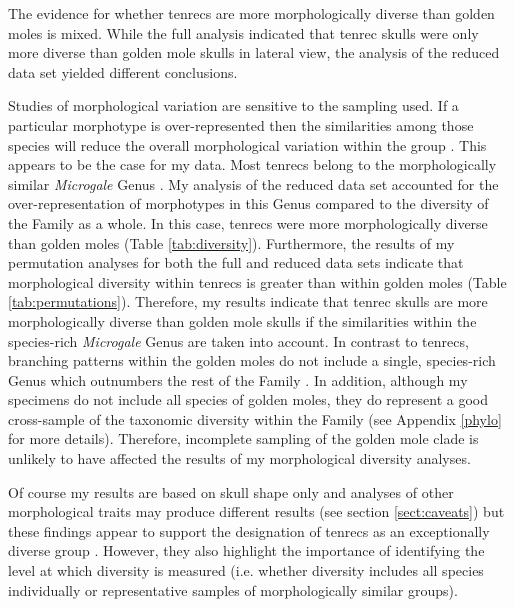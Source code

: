 	

	The evidence for whether tenrecs are more morphologically diverse than golden moles is mixed. While the full analysis indicated that tenrec skulls were only more diverse than golden mole skulls in lateral view, the analysis of the reduced data set yielded different conclusions.
	
	Studies of morphological variation are sensitive to the sampling used. If a particular morphotype is over-represented then the similarities among those species will reduce the overall morphological variation within the group \citep{Foote1991}. This appears to be the case for my data. Most tenrecs belong to the morphologically similar \textit{Microgale} Genus \citep{Jenkins2003}. My analysis of the reduced data set accounted for the over-representation of morphotypes in this Genus compared to the diversity of the Family as a whole. In this case, tenrecs were more morphologically diverse than golden moles (Table \ref{tab:diversity}). Furthermore, the results of my permutation analyses for both the full and reduced data sets indicate that morphological diversity within tenrecs is greater than within golden moles (Table \ref{tab:permutations}).
	Therefore, my results indicate that tenrec skulls are more morphologically diverse than golden mole skulls if the similarities within the species-rich \textit{Microgale} Genus are taken into account. 
	In contrast to tenrecs, branching patterns within the golden moles do not include a single, species-rich Genus which outnumbers the rest of the Family \citep{Asher2010}. In addition, although my specimens do not include all species of golden moles, they do represent a good cross-sample of the taxonomic diversity within the Family (see Appendix \ref{phylo} for more details). Therefore, incomplete sampling of the golden mole clade is unlikely to have affected the results of my morphological diversity analyses.
	
	Of course my results are based on skull shape only and analyses of other morphological traits may produce different results (see section \ref{sect:caveats}) but
	these findings appear to support the designation of tenrecs as an exceptionally diverse group \citep{Olson2013, Eisenberg1969}. However, they also highlight the importance of identifying the level at which diversity is measured (i.e. whether diversity includes all species individually or representative samples of morphologically similar groups). 
	
	

